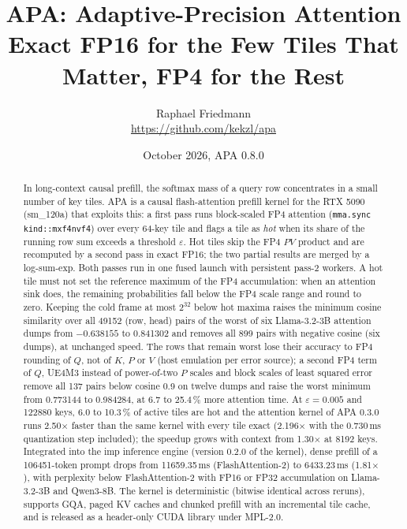 \documentclass[10pt,twocolumn]{article}
\title{APA: Adaptive-Precision Attention\\
\large Exact FP16 for the Few Tiles That Matter, FP4 for the Rest}
\author{Raphael Friedmann\\\small\url{https://github.com/kekzl/apa}}
\date{October 2026, APA 0.8.0}
\newcommand{\eps}{\varepsilon}
\newcommand{\code}[1]{\texttt{#1}}
\begin{document}
\maketitle

\begin{abstract}
In long-context causal prefill, the softmax mass of a query row concentrates in a small number of key tiles.
APA is a causal flash-attention prefill kernel for the RTX 5090 (sm\_120a) that exploits this: a first pass
runs block-scaled FP4 attention (\code{mma.sync kind::mxf4nvf4}) over every 64-key tile and flags a tile as
\emph{hot} when its share of the running row sum exceeds a threshold $\eps$. Hot tiles skip the FP4
$PV$ product and are recomputed by a second pass in exact FP16; the two partial results are merged by a
log-sum-exp. Both passes run in one fused launch with persistent pass-2 workers. A hot tile must not set the
reference maximum of the FP4 accumulation: when an attention sink does, the remaining probabilities fall
below the FP4 scale range and round to zero. Keeping the cold frame at most $2^{32}$ below hot maxima raises
the minimum cosine similarity over all 49152 (row, head) pairs of the worst of six Llama-3.2-3B attention
dumps from $-0.638155$ to 0.841302 and removes all 899 pairs with negative cosine (six dumps), at unchanged speed. The
rows that remain worst lose their accuracy to FP4 rounding of $Q$, not of $K$, $P$ or $V$ (host emulation per
error source); a second FP4 term of $Q$, UE4M3 instead of power-of-two $P$ scales and block scales of least
squared error remove all 137 pairs below cosine 0.9 on twelve dumps and raise the worst minimum from 0.773144 to
0.984284, at 6.7 to 25.4\,\% more attention time. At
$\eps=0.005$ and 122880 keys, 6.0 to 10.3\,\% of active tiles are hot and the attention kernel of APA 0.3.0 runs
2.50$\times$ faster than the same kernel with every tile exact (2.196$\times$ with the 0.730\,ms quantization
step included); the speedup grows with context from 1.30$\times$ at 8192 keys. Integrated into the imp inference engine (version 0.2.0 of the kernel), dense
prefill of a 106451-token prompt drops from 11659.35\,ms (FlashAttention-2) to 6433.23\,ms (1.81$\times$),
with perplexity below FlashAttention-2 with FP16 or FP32 accumulation on Llama-3.2-3B and Qwen3-8B. The kernel is deterministic (bitwise identical across reruns), supports GQA, paged
KV caches and chunked prefill with an incremental tile cache, and is released as a header-only CUDA library
under MPL-2.0.
\end{abstract}
\end{document}
